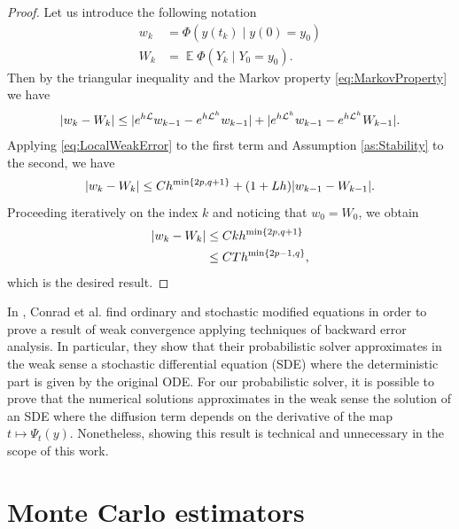 \documentclass{siamart1116}
\numberwithin{theorem}{section}
\DeclarePairedDelimiter{\abs}{\lvert}{\rvert}
\newcommand{\diffL}{\mathcal{L}}
\newcommand{\E}{\operatorname{\mathbb{E}}}
\newcommand{\corr}[1]{{\color{bordeaux}#1}}
\begin{document}
\begin{proof} Let us introduce the following notation
	\begin{equation}
	\begin{aligned}
		w_k &= \Phi(y(t_k) \mid y(0) = y_0)\\
		W_k &= \E\Phi(Y_k \mid Y_0 = y_0).
	\end{aligned}
	\end{equation}
	Then by the triangular inequality and the Markov property \eqref{eq:MarkovProperty} we have
	\begin{equation}
	\begin{aligned}
		\abs{w_k - W_k} \leq \abs{e^{h\diffL}w_{k-1} - e^{h\diffL^h}w_{k-1}} + \abs{e^{h\diffL^h}w_{k-1} - e^{h\diffL^h}W_{k-1}}.
	\end{aligned}
	\end{equation}
	Applying \eqref{eq:LocalWeakError} to the first term and Assumption \ref{as:Stability} to the second, we have
	\begin{equation}
		\abs{w_k - W_k} \leq Ch^{\min\{2p, q + 1\}} + (1 + Lh)\abs{w_{k-1} - W_{k-1}}.
	\end{equation} 
	Proceeding iteratively on the index $k$ and noticing that $w_0 = W_0$, we obtain
	\begin{equation}
	\begin{aligned}
		\abs{w_k - W_k} &\leq C k h^{\min\{2p, q + 1\}}\\
		&\leq C T h^{\min\{2p - 1, q\}},	
	\end{aligned}
	\end{equation}
	which is the desired result.
\end{proof}

\corr{\begin{remark} In \cite{CGS16}, Conrad et al. find ordinary and stochastic modified equations in order to prove a result of weak convergence applying techniques of backward error analysis. In particular, they show that their probabilistic solver approximates in the weak sense a stochastic differential equation (SDE) where the deterministic part is given by the original ODE. For our probabilistic solver, it is possible to prove that the numerical solutions approximates in the weak sense the solution of an SDE where the diffusion term depends on the derivative of the map $t \mapsto \Psi_t(y)$. Nonetheless, showing this result is technical and unnecessary in the scope of this work.
\end{remark}}

\section{Monte Carlo estimators}\label{sec:MonteCarlo}
\end{document}
